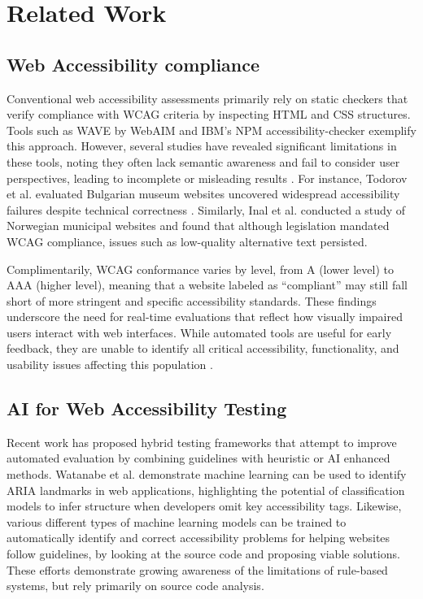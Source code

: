 
\section{Related Work}

\subsection{Web Accessibility compliance}

Conventional web accessibility assessments primarily rely on static checkers that verify compliance with \ac{WCAG} criteria by inspecting HTML and CSS structures. 
Tools such as WAVE by WebAIM\cite{webaim_wave_2025} and IBM's NPM accessibility-checker\cite{ibm_accessibility_checker_2025} exemplify this approach.
However, several studies have revealed significant limitations in these tools, noting they often lack semantic awareness and fail to consider user perspectives, leading to incomplete or misleading results \cite{ara2024inclusive}. 
For instance, Todorov et al. evaluated Bulgarian museum websites uncovered widespread accessibility failures despite technical correctness \cite{todorov2022accessibility}. 
Similarly, Inal et al. conducted a study of Norwegian municipal websites and found that although legislation mandated \ac{WCAG} compliance, issues such as low-quality alternative text persisted\cite{inal2025does}.

Complimentarily, \ac{WCAG} conformance varies by level, from A (lower level) to AAA (higher level), meaning that a website labeled as “compliant” may still fall short of more stringent and specific accessibility standards. These findings underscore the need for real-time evaluations that reflect how visually impaired users interact with web interfaces. 
While automated tools are useful for early feedback, they are unable to identify all critical accessibility, functionality, and usability issues affecting this population \cite{todorov2022accessibility}.

\subsection{AI for Web Accessibility Testing}

Recent work has proposed hybrid testing frameworks that attempt to improve automated evaluation by combining guidelines with heuristic or \ac{AI} enhanced methods. Watanabe et al. \cite{watanabe2024accessibility} demonstrate machine learning can be used to identify ARIA landmarks in web applications, highlighting the potential of classification models to infer structure when developers omit key accessibility tags. 
Likewise, various different types of machine learning models can be trained to automatically identify and correct accessibility problems for helping websites follow guidelines, by looking at the source code and proposing viable solutions\cite{ramineni2024leveraging, kuszczynski2023comparative}. 
These efforts demonstrate growing awareness of the limitations of rule-based systems, but rely primarily on source code analysis.

